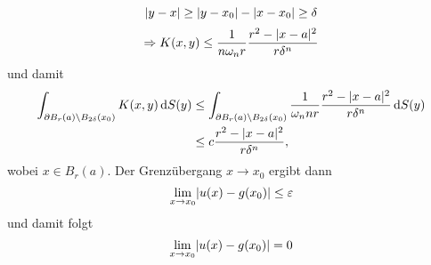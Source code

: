 \begin{beweis}
\begin{enumerate}[(i)]
\[				\lvert y-x\rvert \geq  \lvert y-x_0\rvert- \lvert x-x_0\rvert \geq \delta 
			\]
			\[
				\Rightarrow K(x,y) \leq \frac{1}{n \omega_n r} \frac{r^2 - \lvert x-a\rvert^2}{r \delta ^n}
			\]
			und damit 
			\begin{align*}
				\int_{\partial B_r(a) \setminus B_{2 \delta }(x_0)}^{} K(x,y) \,\mathrm{d}S(y) 
				&\leq \int_{\partial B_r(a) \setminus B_{2 \delta }(x_0)}^{} \frac{1}{\omega_n n r }\frac{ r^2 - \lvert x-a\rvert^2}{r \delta^n } \,\mathrm{d}S(y) \\
				&\leq c \frac{r^2 - \lvert x-a\rvert^2}{r \delta^n} ,
			\end{align*}
			wobei $x \in B_r(a)$. Der Grenzübergang $x \to x_0$ ergibt dann
			\[
				\lim_{x \to x_0} \lvert u(x)-g(x_0)\rvert \leq \varepsilon
			\]
			und damit folgt
			\[
				\lim_{x \to x_0} \lvert u(x)- g(x_0)\rvert = 0
			\]
		\end{enumerate}
	\end{beweis}
\cleardoubleoddemptypage
{}
\setcounter{page}{1}

